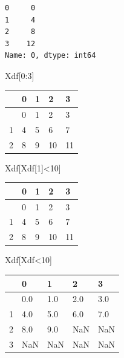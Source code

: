\documentclass[
  a4paper,
  DIV=11,
  numbers=noendperiod]{scrreprt}
\newenvironment{Shaded}{\begin{snugshade}}{\end{snugshade}}
\newcommand{\DecValTok}[1]{\textcolor[rgb]{0.68,0.00,0.00}{#1}}
\newcommand{\NormalTok}[1]{\textcolor[rgb]{0.00,0.23,0.31}{#1}}
\newcommand{\OperatorTok}[1]{\textcolor[rgb]{0.37,0.37,0.37}{#1}}
\begin{document}
\begin{verbatim}
0     0
1     4
2     8
3    12
Name: 0, dtype: int64
\end{verbatim}

\begin{Shaded}
\begin{Highlighting}[]
\NormalTok{Xdf[}\DecValTok{0}\NormalTok{:}\DecValTok{3}\NormalTok{]}
\end{Highlighting}
\end{Shaded}

\begin{longtable}[]{@{}lllll@{}}
\toprule\noalign{}
& 0 & 1 & 2 & 3 \\
\midrule\noalign{}
\endhead
\bottomrule\noalign{}
\endlastfoot
0 & 0 & 1 & 2 & 3 \\
1 & 4 & 5 & 6 & 7 \\
2 & 8 & 9 & 10 & 11 \\
\end{longtable}

\begin{Shaded}
\begin{Highlighting}[]
\NormalTok{Xdf[Xdf[}\DecValTok{1}\NormalTok{]}\OperatorTok{\textless{}}\DecValTok{10}\NormalTok{]}
\end{Highlighting}
\end{Shaded}

\begin{longtable}[]{@{}lllll@{}}
\toprule\noalign{}
& 0 & 1 & 2 & 3 \\
\midrule\noalign{}
\endhead
\bottomrule\noalign{}
\endlastfoot
0 & 0 & 1 & 2 & 3 \\
1 & 4 & 5 & 6 & 7 \\
2 & 8 & 9 & 10 & 11 \\
\end{longtable}

\begin{Shaded}
\begin{Highlighting}[]
\NormalTok{Xdf[Xdf}\OperatorTok{\textless{}}\DecValTok{10}\NormalTok{]}
\end{Highlighting}
\end{Shaded}

\begin{longtable}[]{@{}lllll@{}}
\toprule\noalign{}
& 0 & 1 & 2 & 3 \\
\midrule\noalign{}
\endhead
\bottomrule\noalign{}
\endlastfoot
0 & 0.0 & 1.0 & 2.0 & 3.0 \\
1 & 4.0 & 5.0 & 6.0 & 7.0 \\
2 & 8.0 & 9.0 & NaN & NaN \\
3 & NaN & NaN & NaN & NaN \\
\end{longtable}
\end{document}
